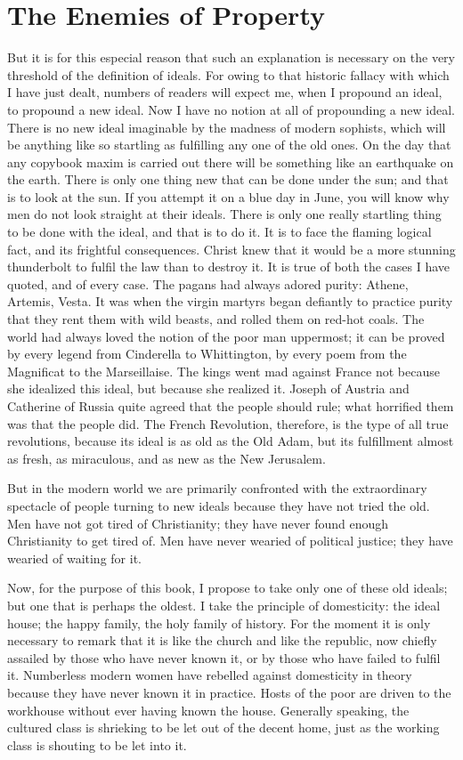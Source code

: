 \documentclass{book}
\begin{document}
\chapter{The Enemies of Property}
\label{chapter-7}
But it is for this especial reason that such an explanation is necessary on the very threshold of the definition of ideals. For owing to that historic fallacy with which I have just dealt, numbers of readers will expect me, when I propound an ideal, to propound a new ideal. Now I have no notion at all of propounding a new ideal. There is no new ideal imaginable by the madness of modern sophists, which will be anything like so startling as fulfilling any one of the old ones. On the day that any copybook maxim is carried out there will be something like an earthquake on the earth. There is only one thing new that can be done under the sun; and that is to look at the sun. If you attempt it on a blue day in June, you will know why men do not look straight at their ideals. There is only one really startling thing to be done with the ideal, and that is to do it. It is to face the flaming logical fact, and its frightful consequences. Christ knew that it would be a more stunning thunderbolt to fulfil the law than to destroy it. It is true of both the cases I have quoted, and of every case. The pagans had always adored purity: Athene, Artemis, Vesta. It was when the virgin martyrs began defiantly to practice purity that they rent them with wild beasts, and rolled them on red-hot coals. The world had always loved the notion of the poor man uppermost; it can be proved by every legend from Cinderella to Whittington, by every poem from the Magnificat to the Marseillaise. The kings went mad against France not because she idealized this ideal, but because she realized it. Joseph of Austria and Catherine of Russia quite agreed that the people should rule; what horrified them was that the people did. The French Revolution, therefore, is the type of all true revolutions, because its ideal is as old as the Old Adam, but its fulfillment almost as fresh, as miraculous, and as new as the New Jerusalem.

But in the modern world we are primarily confronted with the extraordinary spectacle of people turning to new ideals because they have not tried the old. Men have not got tired of Christianity; they have never found enough Christianity to get tired of. Men have never wearied of political justice; they have wearied of waiting for it.

Now, for the purpose of this book, I propose to take only one of these old ideals; but one that is perhaps the oldest. I take the principle of domesticity: the ideal house; the happy family, the holy family of history. For the moment it is only necessary to remark that it is like the church and like the republic, now chiefly assailed by those who have never known it, or by those who have failed to fulfil it. Numberless modern women have rebelled against domesticity in theory because they have never known it in practice. Hosts of the poor are driven to the workhouse without ever having known the house. Generally speaking, the cultured class is shrieking to be let out of the decent home, just as the working class is shouting to be let into it.
\end{document}
